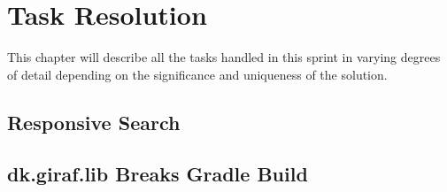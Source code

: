 \chapter{Task Resolution}
This chapter will describe all the tasks handled in this sprint in varying degrees of detail depending on the significance and uniqueness of the solution.


\section{Responsive Search}\label{RSearch}




\section{dk.giraf.lib Breaks Gradle Build}

